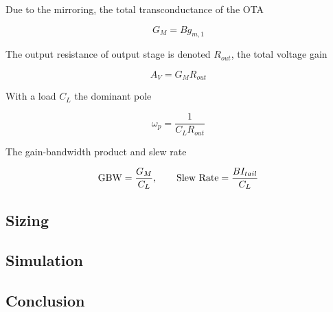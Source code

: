 \documentclass[../main.tex]{subfiles}
\begin{document}
\noindent
Due to the mirroring, the total transconductance of the OTA

$$
G_M = B g_{m,1}
$$

\noindent
The output resistance of output stage is denoted $R_{out}$, the total voltage gain 

$$
A_V = G_M R_{out}
$$

\noindent
With a load $C_L$ the dominant pole

$$
\omega_{p} = \frac{1}{C_L R_{out}}
$$

\noindent
The gain-bandwidth product and slew rate

$$ \text{GBW} = \frac{G_M}{C_L}, \hspace*{20pt} \text{Slew Rate} = \frac{B I_{tail}}{C_L} $$


\subsection{Sizing}

\subsection{Simulation}

\subsection{Conclusion}
\end{document}
